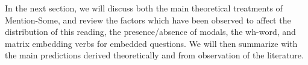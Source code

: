\documentclass[12pt,letterpaper,table,svgnames,dvipsnames]{article}
\newcommand{\jd}[1]{\textcolor{Purple}{[jd: #1]}}
\newcommand{\whq}{\emph{wh}-question~}
\begin{document}








In the next section, we will discuss both the main theoretical treatments of Mention-Some, and review the factors which have been observed to affect the distribution of this reading, the presence/absence of modals, the wh-word, and matrix embedding verbs for embedded questions. We will then summarize with the main predictions derived theoretically and from observation of the literature. 
\end{document}
